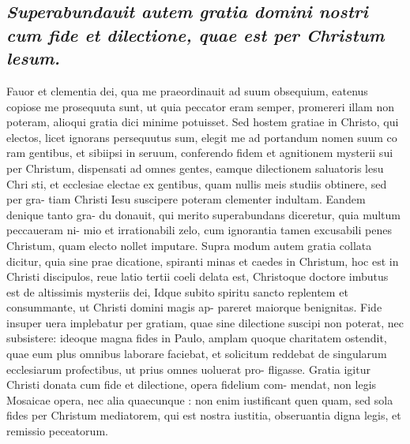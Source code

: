 \documentclass{article}
\begin{document}
\begin{pages}
\subsection*{\textit{Superabundauit autem gratia domini nostri cum fide et dilectione, quae est per Christum lesum. }}\pstart Fauor et clementia dei, qua me praeordinauit ad suum obsequium, eatenus copiose me prosequuta sunt, ut quia peccator eram semper, promereri illam non poteram, alioqui gratia dici minime potuisset. Sed hostem gratiae in Christo, qui electos, licet ignorans persequutus sum, elegit me ad portandum nomen suum co ram gentibus, et sibiipsi in seruum, conferendo fidem et agnitionem mysterii sui per Christum, dispensati ad omnes gentes, eamque dilectionem saluatoris lesu Chri sti, et ecclesiae electae ex gentibus, quam nullis meis studiis obtinere, sed per gra- tiam Christi Iesu suscipere poteram clementer indultam. Eandem denique tanto gra- du donauit, qui merito superabundans diceretur, quia multum peccaueram ni- mio et irrationabili zelo, cum ignorantia tamen excusabili penes Christum, quam electo nollet imputare. Supra modum autem gratia collata dicitur, quia sine prae dicatione, spiranti minas et caedes in Christum, hoc est in Christi discipulos, reue latio tertii coeli delata est, Christoque doctore imbutus est de altissimis mysteriis dei, Idque subito spiritu sancto replentem et consummante, ut Christi domini magis ap- pareret maiorque benignitas. Fide insuper uera implebatur per gratiam, quae sine dilectione suscipi non poterat, nec subsistere: ideoque magna fides in Paulo, amplam quoque charitatem ostendit, quae eum plus omnibus laborare faciebat, et solicitum reddebat de singularum ecclesiarum profectibus, ut prius omnes uoluerat pro- fligasse. Gratia igitur Christi donata cum fide et dilectione, opera fidelium com- mendat, non legis Mosaicae opera, nec alia quaecunque : non enim iustificant quen quam, sed sola fides per Christum mediatorem, qui est nostra iustitia, obseruantia digna legis, et remissio peceatorum.  \pend
{}
{}

\end{pages}
\end{document}
